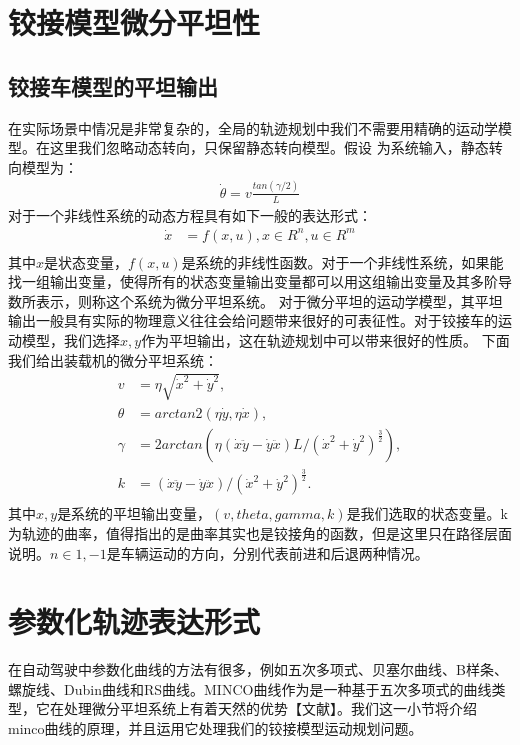 \documentclass[master,academic]{ysuthesis} %
\begin{document}
	\section{铰接模型微分平坦性}
		\subsection{铰接车模型的平坦输出}
		在实际场景中情况是非常复杂的，全局的轨迹规划中我们不需要用精确的运动学模型。在这里我们忽略动态转向，只保留静态转向模型。假设 为系统输入，静态转向模型为：
		\begin{equation}
			\begin{aligned}
				\dot{\theta}=v\frac{tan( \gamma /2 )}{L}
			\end{aligned}
		\end{equation}
		对于一个非线性系统的动态方程具有如下一般的表达形式：
		\begin{equation}
			\begin{aligned}
				\dot{x}&=f( x,u ) ,x\in R^n,u\in R^m\\
			\end{aligned}
		\end{equation}
		其中$x$是状态变量，$f(x,u)$是系统的非线性函数。对于一个非线性系统，如果能找一组输出变量，使得所有的状态变量输出变量都可以用这组输出变量及其多阶导数所表示，则称这个系统为微分平坦系统。
		对于微分平坦的运动学模型，其平坦输出一般具有实际的物理意义往往会给问题带来很好的可表征性。对于铰接车的运动模型，我们选择$x,y$作为平坦输出，这在轨迹规划中可以带来很好的性质。
		下面我们给出装载机的微分平坦系统：
		\begin{equation}
			\begin{aligned}
				v&=\eta \sqrt{\dot{x}^2+\dot{y}^2},\\
				\theta &=arctan2( \eta \dot{y},\eta \dot{x} ) ,\\
				\gamma &=2arctan( \eta ( \dot{x}\ddot{y}-\dot{y}\ddot{x} ) L/( \dot{x}^2+\dot{y}^2 ) ^{\frac{3}{2}} ) ,\\
				k&=( \dot{x}\ddot{y}-\dot{y}\ddot{x} ) /( \dot{x}^2+\dot{y}^2 ) ^{\frac{3}{2}}.\\
			\end{aligned}
		\end{equation}
	其中$x,y$是系统的平坦输出变量，$(v,theta,gamma,k)$是我们选取的状态变量。k为轨迹的曲率，值得指出的是曲率其实也是铰接角的函数，但是这里只在路径层面说明。$n\in{1,-1}$是车辆运动的方向，分别代表前进和后退两种情况。
	\section{参数化轨迹表达形式}
	在自动驾驶中参数化曲线的方法有很多，例如五次多项式、贝塞尔曲线、B样条、螺旋线、Dubin曲线和RS曲线。MINCO曲线作为是一种基于五次多项式的曲线类型，它在处理微分平坦系统上有着天然的优势【文献】。我们这一小节将介绍minco曲线的原理，并且运用它处理我们的铰接模型运动规划问题。
\end{document}
